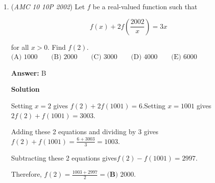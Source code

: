 \begin{enumerate}
 Case 3: The hundreds place is $3.$This case is almost identical to the second case, just swap the $2$s with $3$s and $3$s with $2$s in the reasoning and it's the same, giving us an additional $19$ cases.

 Adding up all of these cases gives $14+19+19=52$ cases, or $\boxed{\textbf{(A) }52}.$




\textbf{Solution 2 (PIE)}

We can solve this problem with the principle of inclusion-exclusion. Let $\#(A)$ be the number of three-digit numbers without the digit $2$, let $\#(B)$ be the number of three-digit numbers without the digit $3$, and let $\#(A \cap B)$ be the number of three-digit numbers without digits $2$ or $3$.

 Notice that $\#(A)=\#(B)$ by symmetry. We use constructive counting to find that 
 \[\#(A) = 8 \cdot 9 \cdot 9 = 648\] so $\#(A) = \#(B) = 648$. Similarly, 
 \[\#(A \cap B) = 7 \cdot 8 \cdot 8 = 448.\]

 Hence, by PIE, 
 \[\#(A \cup B) = \#(A) + \#(B) - \#(A \cap B) = 648 + 648 - 448 = 848\] so the count of three-digit numbers that do not have a digit $2$ or a digit $3$ is $\#(A \cup B) = 848$.

 There are $9 \cdot 10 \cdot 10 = 900$ ways to construct a three-digit number in total, so we have $900 - 848 = \boxed{\textbf{(A) }52}$ numbers that have at least one of digit $2$ and $3$.

 


	\item (\textit{AMC 10 10P 2002}) Let $f$ be a real-valued function such that


 
 \[f(x) + 2f(\frac{2002}{x}) = 3x\]


 for all $x>0.$ Find $f(2).$
$\text{(A) }1000 \qquad \text{(B) }2000 \qquad \text{(C) }3000 \qquad \text{(D) }4000 \qquad \text{(E) }6000$

 \textbf{Answer: }B



\textbf{Solution}

Setting $x = 2$ gives $f(2) + 2f(1001) = 6$.Setting $x = 1001$ gives $2f(2) + f(1001) = 3003$.

 Adding these 2 equations and dividing by 3 gives$f(2) + f(1001) = \frac{6+3003}{3} = 1003$.

 Subtracting these 2 equations gives$f(2) - f(1001) = 2997$.

 Therefore, $f(2) = \frac{1003+2997}{2} = \boxed {\textbf{(B) }2000}$.


\end{enumerate}
